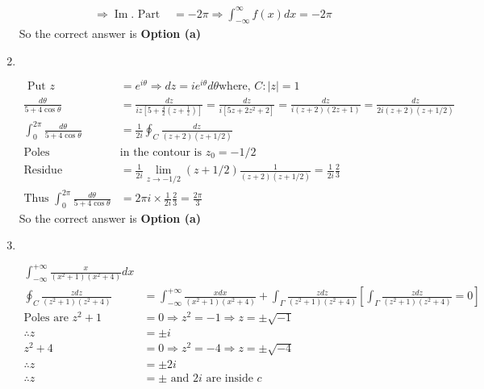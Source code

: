 \begin{enumerate}
\begin{answer}
\begin{align*}
	\\\Rightarrow \operatorname{Im}.\text{ Part }&=-2 \pi \Rightarrow \int_{-\infty}^{\infty} f(x) d x=-2 \pi
	\end{align*}
	So the correct answer is \textbf{Option (a)}	
\end{answer}
\item $\left. \right. $
\begin{answer}
	\begin{align*}
	\text{	Put }z&=e^{i \theta} \Rightarrow d z=i e^{i \theta} d \theta \text{where, }C:|z|=1\\
	\frac{d \theta}{5+4 \cos \theta}&=\frac{d z}{i z\left[5+\frac{4}{2}\left(z+\frac{1}{z}\right)\right]}=\frac{d z}{i\left[5 z+2 z^{2}+2\right]}=\frac{d z}{i(z+2)(2 z+1)}=\frac{d z}{2 i(z+2)(z+1 / 2)}\\
	\int_{0}^{2 \pi} \frac{d \theta}{5+4 \cos \theta}&=\frac{1}{2 i} \oint_{C} \frac{d z}{(z+2)(z+1 / 2)}\\
	\text{Poles }&\text{in the contour is }z_{0}=-1 / 2\\
	\text{Residue }&=\frac{1}{2 i} \lim _{z \rightarrow-1 / 2}(z+1 / 2) \frac{1}{(z+2)(z+1 / 2)}=\frac{1}{2 i} \frac{2}{3}\\
	\text{Thus }\int_{0}^{2 \pi} \frac{d \theta}{5+4 \cos \theta}&=2 \pi i \times \frac{1}{2 i} \frac{2}{3}=\frac{2 \pi}{3}
	\end{align*}
	So the correct answer is \textbf{Option (a)}	
\end{answer}
\item $\left. \right. $
\begin{answer}
	\begin{align*}
	\int_{-\infty}^{+\infty} \frac{x}{\left(x^{2}+1\right)\left(x^{2}+4\right)} d x&\\
	\oint_{C} \frac{z d z}{\left(z^{2}+1\right)\left(z^{2}+4\right)}&=\int_{-\infty}^{+\infty} \frac{x d x}{\left(x^{2}+1\right)\left(x^{2}+4\right)}+\int_{\Gamma} \frac{z d z}{\left(z^{2}+1\right)\left(z^{2}+4\right)}\left[\int_{\Gamma} \frac{z d z}{\left(z^{2}+1\right)\left(z^{2}+4\right)}=0\right]\\
	\text{Poles are }z^{2}+1&=0 \Rightarrow z^{2}=-1 \Rightarrow z=\pm \sqrt{-1}\\
	\therefore z&=\pm i \\
	z^{2}+4&=0 \Rightarrow z^{2}=-4 \Rightarrow z=\pm \sqrt{-4} \\
	\therefore z&=\pm 2 i\\
	\therefore z&=\pm \text { and } 2 i \text { are inside } c\\

\end{align*}
\end{answer}
\end{enumerate}
